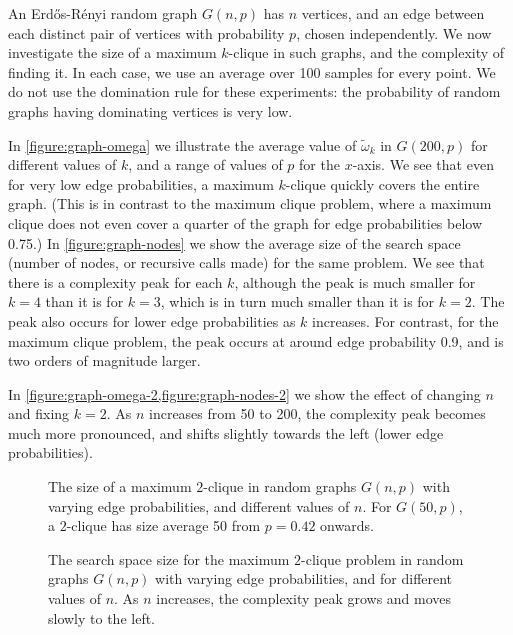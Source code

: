 \documentclass[letterpaper]{article}
\begin{document}
An Erd\H{o}s-R\'{e}nyi random graph $G(n, p)$ has $n$ vertices, and an edge between each distinct
pair of vertices with probability $p$, chosen independently. We now investigate the size of a
maximum $k$-clique in such graphs, and the complexity of finding it. In each case, we use an average
over 100 samples for every point.  We do not use the domination rule for these experiments: the
probability of random graphs having dominating vertices is very low.

In \cref{figure:graph-omega} we illustrate the average value of $\tilde{\omega}_k$ in $G(200,
p)$ for different values of $k$, and a range of values of $p$ for the $x$-axis. We see that even for
very low edge probabilities, a maximum $k$-clique quickly covers the entire graph.  (This is in contrast to
the maximum clique problem, where a maximum clique does not even cover a quarter of the graph for
edge probabilities below 0.75.) In \cref{figure:graph-nodes} we show the average size of the
search space (number of nodes, or recursive calls made) for the same problem. We see that there is a
complexity peak for each $k$, although the peak is much smaller for $k = 4$ than it is for $k = 3$,
which is in turn much smaller than it is for $k = 2$. The peak also occurs for lower edge
probabilities as $k$ increases. For contrast, for the maximum clique problem, the peak occurs at
around edge probability 0.9, and is two orders of magnitude larger.

In \cref{figure:graph-omega-2,figure:graph-nodes-2} we show the effect of
changing $n$ and fixing $k = 2$. As $n$ increases from 50 to 200, the complexity peak becomes much
more pronounced, and shifts slightly towards the left (lower edge probabilities).

\begin{figure}[t]
    \centering
    
    \caption{The size of a maximum $2$-clique in random graphs $G(n, p)$ with varying edge
        probabilities, and different values of $n$. For $G(50, p)$, a $2$-clique has size average 50
    from $p = 0.42$ onwards.}
    \label{figure:graph-omega-2}

    \vspace*{2em}
    \centering
    
    \caption{The search space size for the maximum $2$-clique problem in random graphs $G(n, p)$
        with varying edge probabilities, and for different values of $n$. As $n$ increases, the
    complexity peak grows and moves slowly to the left.}
    \label{figure:graph-nodes-2}
\end{figure}
\end{document}
